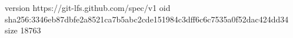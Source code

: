 version https://git-lfs.github.com/spec/v1
oid sha256:3346eb87dbfe2a8521ca7b5abc2cde151984c3dff6c6c7535a0f52dac424dd34
size 18763
